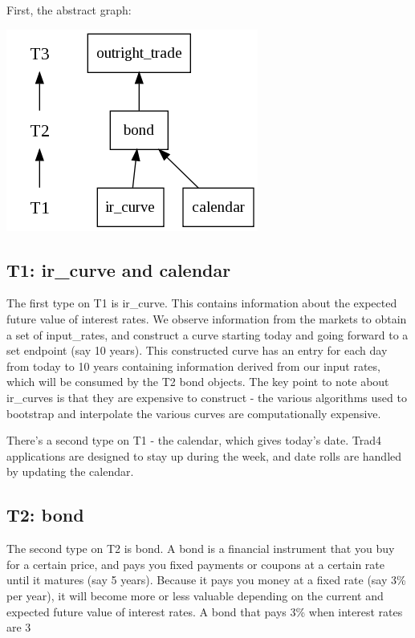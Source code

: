 \documentclass{report}
\begin{document}
First, the abstract graph:

\includegraphics[scale=0.5]{bondrisksimpleabstract.png}

\subsection{T1: ir_curve and calendar}

The first type on T1 is ir_curve. This contains information about the expected future value of interest rates. We observe information from the markets to obtain a set of input_rates, and construct a curve starting today and going forward to a set endpoint (say 10 years). This constructed curve has an entry for each day from today to 10 years containing information derived from our input rates, which will be consumed by the T2 bond objects. The key point to note about ir_curves is that they are expensive to construct - the various algorithms used to bootstrap and interpolate the various curves are computationally expensive.

There's a second type on T1 - the calendar, which gives today's date. Trad4 applications are designed to stay up during the week, and date rolls are handled by updating the calendar.

\subsection{T2: bond}

The second type on T2 is bond. A bond is a financial instrument that you buy for a certain price, and pays you fixed payments or coupons at a certain rate until it matures (say 5 years). Because it pays you money at a fixed rate (say 3\% per year), it will become more or less valuable depending on the current and expected future value of interest rates. A bond that pays 3\% when interest rates are 3%
\end{document}
